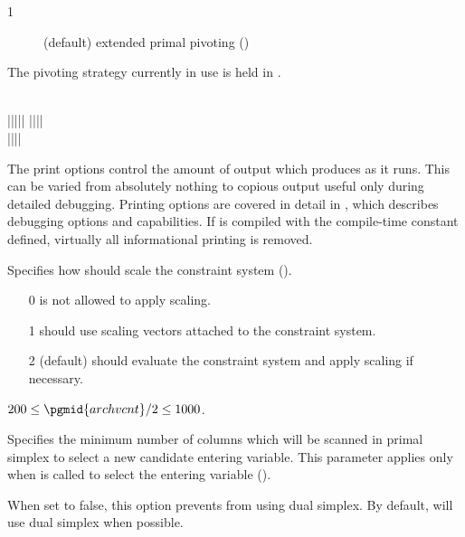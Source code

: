 \begin{codedoc}
\begin{description}
    \item[1] (default) extended primal pivoting
	     (\vid {})
  \end{description}
  The pivoting strategy currently in use is held in .

  \item{}
  \bgroup \raggedright
     \kw{;} \\
   \bnfeq {}|||||
      |||| \\
      \hspace{8ex}
      ||||
  \egroup

  The print options control the amount of output which \dylp produces as it
  runs.
  This can be varied from absolutely nothing to copious output useful only
  during detailed debugging.
  Printing options are covered in detail in , which
  describes debugging options and capabilities.
  If \dylp is compiled with the compile-time constant  defined,
  virtually all informational printing is removed.

  \item{}
    \kw{;}

  Specifies how \dylp should scale the constraint system ().
  \begin{itemize}
    \item[0] \dylp is not allowed to apply scaling.

    \item[1] \dylp should use scaling vectors attached to the constraint
	     system.

    \item[2] (default) \dylp should evaluate the constraint system and apply
	     scaling if necessary.
  \end{itemize}

  \item{}
    \kw{;}

  $200 \le \pgmid{archvcnt}/2 \le 1000$.

  Specifies the minimum number of columns which will be scanned in primal
  simplex to select a new candidate entering variable.
  This parameter applies only when  is called to select
  the entering variable (\vid {}).

  \item{}
    \kw{;}

  When set to false, this option prevents \dylp from using dual simplex.
  By default, \dylp will use dual simplex when possible.
\end{codedoc}

